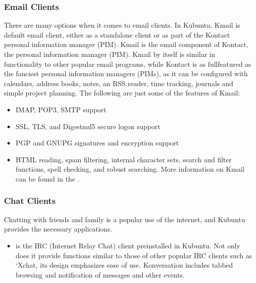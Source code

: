 \documentclass[letterpaper,10pt,english]{sphinxmanual}
\begin{document}
\subsubsection{Email Clients}
\label{\detokenize{docs/software-management/software:email-clients}}
\sphinxAtStartPar
There are many options when it comes to email clients. In Kubuntu, Kmail is default email client, either as a stand\sphinxhyphen{}alone client or as part of the Kontact personal information manager (PIM). Kmail is the email component of Kontact, the  personal information manager (PIM). Kmail by itself is similar in functionality to other popular email programs, while Kontact is as full\sphinxhyphen{}featured as the fanciest personal information managers (PIMs), as it can be configured with calendars, address books, notes, an RSS reader, time tracking, journals and simple project planning. The following are just some of the features of Kmail:
\begin{itemize}
\item {} 
\sphinxAtStartPar
IMAP, POP3, SMTP support

\item {} 
\sphinxAtStartPar
SSL, TLS, and Digest\sphinxhyphen{}md5 secure logon support

\item {} 
\sphinxAtStartPar
PGP and GNUPG signatures and encryption support

\item {} 
\sphinxAtStartPar
HTML reading, spam filtering, internal character sets, search and filter functions, spell checking, and robust searching. More information on Kmail can be found in the .

\end{itemize}


\subsubsection{Chat Clients}
\label{\detokenize{docs/software-management/software:chat-clients}}
\sphinxAtStartPar
Chatting with friends and family is a popular use of the internet, and Kubuntu provides the necessary applications.
\begin{itemize}
\item {} 
\sphinxAtStartPar
{} is the IRC (Internet Relay Chat) client pre\sphinxhyphen{}installed in Kubuntu. Not only does it provide functions similar to those of other popular IRC clients such as ‘X\sphinxhyphen{}chat, its design emphasizes ease of use. Konversation includes tabbed browsing and notification of messages and other events.

\end{itemize}
\end{document}
